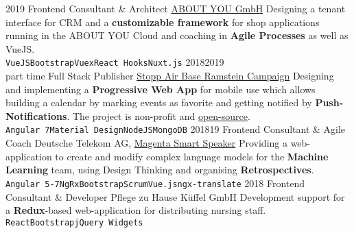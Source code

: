 \documentclass[9pt]{developercv} %
\begin{document}
\begin{entrylist}
  \entry
		{2019}
		{Frontend Consultant \& Architect}
		{\href{https://cloud.aboutyou.com/}{ABOUT YOU GmbH}}
    {
      Designing a tenant interface for CRM and a \textbf{customizable framework} for shop applications
      running in the ABOUT YOU Cloud and coaching in \textbf{Agile Processes} as well as VueJS.\\
      \texttt{VueJS}\slashsep\texttt{Bootstrap}\slashsep\texttt{Vuex}\slashsep\texttt{React Hooks}\slashsep\texttt{Nuxt.js}
    }
	\entry
		{2018\/2019\\\footnotesize{part time}}
		{Full Stack Publisher}
		{\href{https://www.ramstein-kampagne.eu/}{Stopp Air Base Ramstein Campaign}}
    {
      Designing and implementing a \textbf{Progressive Web App} for mobile use which allows building a calendar by
      marking events as favorite and getting notified by \textbf{Push-Notifications}. The project is non-profit and
      \href{https://github.com/frot-io/ramstein-conference-app}{open-source}.\\
      \texttt{Angular 7}\slashsep\texttt{Material Design}\slashsep\texttt{NodeJS}\slashsep\texttt{MongoDB}
    }
  \entry
		{2018\/19}
		{Frontend Consultant \& Agile Coach}
		{Deutsche Telekom AG, \href{https://www.telekom.de/zuhause/geraete-und-zubehoer/smart-speaker}{Magenta Smart Speaker}}
    {
      Providing a web-application to create and modify complex language models for the
      \textbf{Machine Learning} team, using Design Thinking and organising \textbf{Retrospectives}.\\
      \texttt{Angular 5-7}\slashsep\texttt{NgRx}\slashsep\texttt{Bootstrap}\slashsep\texttt{Scrum}\slashsep\texttt{Vue.js}\slashsep\texttt{ngx-translate}
    }
	\entry
		{2018}
		{Frontend Consultant \& Developer}
		{Pflege zu Hause Küffel GmbH}
		{
      Development support for a \textbf{Redux}-based web-application for distributing nursing staff.\\
      \texttt{React}\slashsep\texttt{Bootstrap}\slashsep\texttt{jQuery Widgets}
    }
\end{entrylist}



\end{document}
